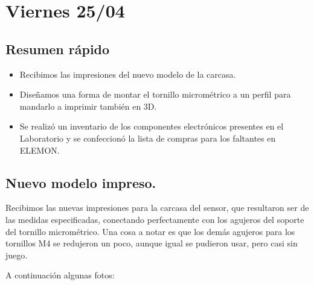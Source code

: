 \section{Viernes 25/04}
\subsection*{Resumen rápido}
\begin{itemize}
	\item Recibimos las impresiones del nuevo modelo de la carcasa.
	\item Diseñamos una forma de montar el tornillo micrométrico a un perfil para mandarlo a imprimir también en 3D.
	\item Se realizó un inventario de los componentes electrónicos presentes en el Laboratorio y se confeccionó la lista de compras para los faltantes en ELEMON. 
\end{itemize}

\subsection*{Nuevo modelo impreso.}
Recibimos las nuevas impresiones para la carcasa del sensor, que resultaron ser de las medidas especificadas, conectando perfectamente con los agujeros del soporte del tornillo micrométrico. Una cosa a notar es que los demás agujeros para los tornillos M4 se redujeron un poco, aunque igual se pudieron usar, pero casi sin juego. %

A continuación algunas fotos: 

